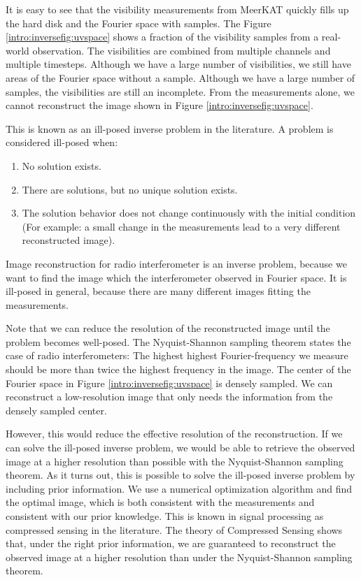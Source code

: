 It is easy to see that the visibility measurements from MeerKAT quickly fills up the hard disk and the Fourier space with samples. The Figure \ref{intro:inversefig:uvspace} shows a fraction of the visibility samples from a real-world observation. The visibilities are combined from multiple channels and multiple timesteps. Although we have a large number of visibilities, we still have areas of the Fourier space without a sample. Although we have a large number of samples, the visibilities are still an incomplete. From the measurements alone, we cannot reconstruct the image shown in Figure \ref{intro:inversefig:uvspace}.

This is known as an ill-posed inverse problem in the literature. A problem is considered ill-posed when:
\begin{enumerate}
	\item No solution exists.
	\item There are solutions, but no unique solution exists.
	\item The solution behavior does not change continuously with the initial condition (For example: a small change in the measurements lead to a very different reconstructed image).
\end{enumerate}
Image reconstruction for radio interferometer is an inverse problem, because we want to find the image which the interferometer observed in Fourier space. It is ill-posed in general, because there are many different images fitting the measurements.

Note that we can reduce the resolution of the reconstructed image until the problem becomes well-posed. The Nyquist-Shannon sampling theorem states the case of radio interferometers: The highest highest Fourier-frequency we measure should be more than twice the highest frequency in the image. The center of the Fourier space in Figure \ref{intro:inversefig:uvspace} is densely sampled. We can reconstruct a low-resolution image that only needs the information from the densely sampled center.

However, this would reduce the effective resolution of the reconstruction. If we can solve the ill-posed inverse problem, we would be able to retrieve the observed image at a higher resolution than possible with the Nyquist-Shannon sampling theorem. As it turns out, this is possible to solve the ill-posed inverse problem by including prior information. We use a numerical optimization algorithm and find the optimal image, which is both consistent with the measurements and consistent with our prior knowledge. This is known in signal processing as compressed sensing \cite{candes2006robust,donoho2006compressed} in the literature. The theory of Compressed Sensing shows that, under the right prior information, we are guaranteed to reconstruct the observed image at a higher resolution than under the Nyquist-Shannon sampling theorem.

